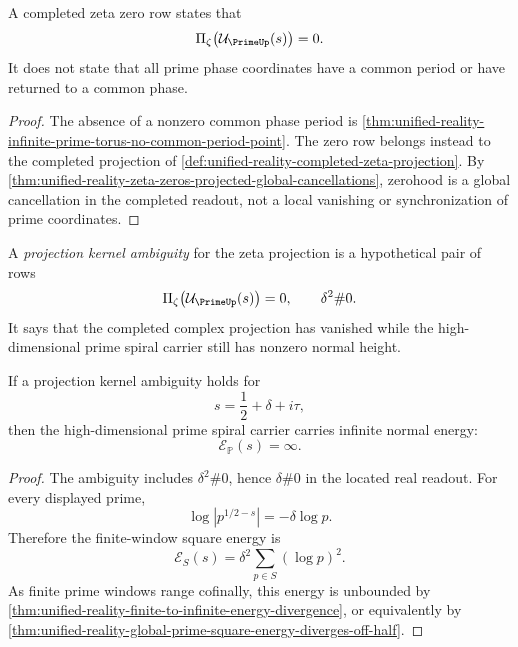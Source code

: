 \begin{theorem}
\label{thm:unified-reality-zero-projection-not-coordinate-synchronization}
A completed zeta zero row states that
$$
\Pi_{\zeta}\bigl(\mathcal U_{\PrimeUp}(s)\bigr)=0.
$$
It does not state that all prime phase coordinates have a common period
or have returned to a common phase.
\end{theorem}

\begin{proof}
The absence of a nonzero common phase period is
\autoref{thm:unified-reality-infinite-prime-torus-no-common-period-point}.
The zero row belongs instead to the completed projection of
\autoref{def:unified-reality-completed-zeta-projection}.  By
\autoref{thm:unified-reality-zeta-zeros-projected-global-cancellations},
zerohood is a global cancellation in the completed readout, not a local
vanishing or synchronization of prime coordinates.
\end{proof}

\begin{definition}
\label{def:unified-reality-projection-kernel-ambiguity}
A \emph{projection kernel ambiguity} for the zeta projection is a
hypothetical pair of rows
$$
\Pi_{\zeta}\bigl(\mathcal U_{\PrimeUp}(s)\bigr)=0,
\qquad
\delta^2\#0.
$$
It says that the completed complex projection has vanished while the
high-dimensional prime spiral carrier still has nonzero normal height.
\end{definition}

\begin{theorem}
\label{thm:unified-reality-off-half-projection-zeros-carry-infinite-normal-energy}
If a projection kernel ambiguity holds for
$$
s=\frac12+\delta+i\tau,
$$
then the high-dimensional prime spiral carrier carries infinite normal
energy:
$$
\mathcal E_{\mathbb P}(s)=\infty.
$$
\end{theorem}

\begin{proof}
The ambiguity includes $\delta^2\#0$, hence $\delta\#0$ in the located
real readout.  For every displayed prime,
$$
\log |p^{1/2-s}|=-\delta\log p.
$$
Therefore the finite-window square energy is
$$
\mathcal E_S(s)
=
\delta^2\sum_{p\in S}(\log p)^2.
$$
As finite prime windows range cofinally, this energy is unbounded by
\autoref{thm:unified-reality-finite-to-infinite-energy-divergence}, or
equivalently by
\autoref{thm:unified-reality-global-prime-square-energy-diverges-off-half}.
\end{proof}

